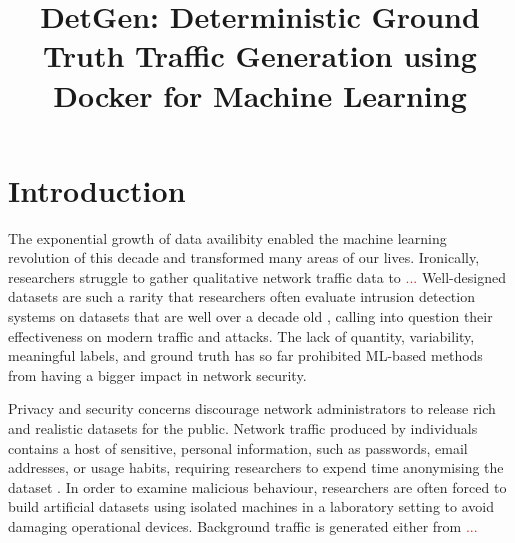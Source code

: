 \documentclass[sigconf,anonymous]{acmart}\usepackage[]{graphicx}\usepackage[]{color}
\begin{document}
\title{DetGen: Deterministic Ground Truth Traffic Generation using Docker for Machine Learning}


\begin{abstract}



\end{abstract}

% 

\maketitle

\section{Introduction}


The exponential growth of data availibity enabled the machine learning revolution of this decade and transformed many areas of our lives. Ironically, researchers struggle to gather qualitative network traffic data to \textcolor{red}{...}
Well-designed datasets are such a rarity that researchers often evaluate intrusion detection systems on datasets that are well over a decade old \cite{tavallaee2009detailed, kayacik2005selecting}, calling into question their effectiveness on modern traffic and attacks. 
The lack of quantity, variability, meaningful labels, and ground truth has so far prohibited ML-based methods from having a bigger impact in network security.


Privacy and security concerns discourage network administrators to release rich and realistic datasets for the public. Network traffic produced by individuals contains a host of sensitive, personal information, such as passwords, email addresses, or usage habits, requiring researchers to expend time anonymising the dataset \cite{mirsky2016sherlock}. In order to examine malicious behaviour, researchers are often forced to build artificial datasets using isolated machines in a laboratory setting to avoid damaging operational devices. Background traffic is generated either from \textcolor{red}{...}
\end{document}
